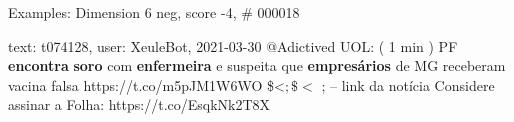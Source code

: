 \begin{frame}{Examples: Dimension 6 neg, score -4, \# 000018}
\footnotesize
\begin{alertblock}{text: t074128, user: XeuleBot, 2021-03-30}
@Adictived UOL: ( 1 min ) PF \textbf{encontra} \textbf{soro} com 
\textbf{enfermeira} e suspeita que \textbf{empresários} de MG receberam vacina 
falsa https://t.co/m5pJM1W6WO \$<$ ; \$<$ ; -- link da notícia Considere 
assinar a Folha: https://t.co/EsqkNk2T8X 
\end{alertblock}
\end{frame}
